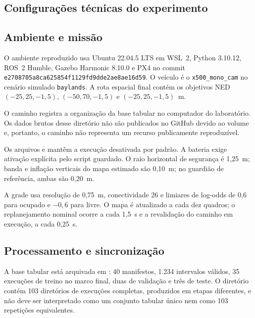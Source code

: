 \begin{apendicesenv}

\partapendices

\chapter[Configurações]{Configurações técnicas do experimento}

\section{Ambiente e missão}

O ambiente reproduzido usa Ubuntu 22.04.5 LTS em WSL~2, Python 3.10.12, ROS~2 Humble, Gazebo Harmonic 8.10.0 e PX4 no commit \texttt{e2708705a8ca625854f1129fd9dde2ae8ae16d59}. O veículo é o \texttt{x500\_mono\_cam} no cenário simulado \texttt{baylands}. A rota espacial final contém os objetivos NED $(-25,25,-1{,}5)$, $(-50,70,-1{,}5)$ e $(-25,25,-1{,}5)$~m.

O caminho  registra a organização da base tabular no computador do laboratório. Os dados brutos desse diretório não são publicados no GitHub devido ao volume e, portanto, o caminho não representa um recurso publicamente reproduzível.

Os arquivos  e  mantêm a execução desativada por padrão. A bateria exige ativação explícita pelo script guardado. O raio horizontal de segurança é 1,25~m; banda e inflação verticais do mapa estimado são 0,10~m; no guardião de referência, ambas são 0,20~m.

A grade usa resolução de 0,75~m, conectividade 26 e limiares de log-odds de 0,6 para ocupado e $-0,6$ para livre. O mapa é atualizado a cada dez quadros; o replanejamento nominal ocorre a cada 1,5~s e a revalidação do caminho em execução, a cada 0,25~s.

\section{Processamento e sincronização}

A base tabular está arquivada em : 40 manifestos, 1.234 intervalos válidos, 35 execuções de treino no marco final, duas de validação e três de teste. O diretório  contém 103 diretórios de execuções completas, produzidos em etapas diferentes, e não deve ser interpretado como um conjunto tabular único nem como 103 repetições equivalentes.


\end{apendicesenv}
